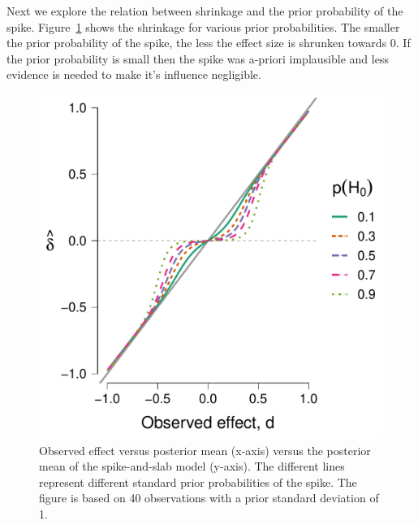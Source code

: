 \documentclass[a4paper]{article}
\newcommand{\DON}[1]{\todo[inline, color=white]{Don: #1}}
\newenvironment{revision}{\color{teal}}{\color{black}}
\begin{document}
\begin{revision}
Next we explore the relation between shrinkage and the prior probability of the spike.
Figure~\ref{fig:S_vs_SS_PH0_40} shows the shrinkage for various prior probabilities.
The smaller the prior probability of the spike, the less the effect size is shrunken towards 0.
If the prior probability is small then the spike was a-priori implausible and less evidence is needed to make it's influence negligible.
\begin{figure}[!ht]
	\centering
	\includegraphics[width=.5\textwidth]{posteriorMeanVsSampleDelta_ph0_n_40.pdf}
	\caption{%
		Observed effect versus posterior mean (x-axis) versus the posterior mean of the spike-and-slab model (y-axis). The different lines represent different standard prior probabilities of the spike. The figure is based on 40 observations with a prior standard deviation of 1.
	}
	\label{fig:S_vs_SS_PH0_40}
\end{figure}


\end{revision}
\end{document}
